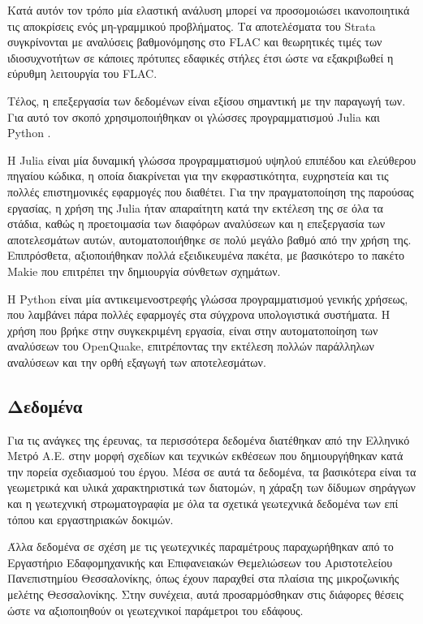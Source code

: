 Κατά αυτόν τον τρόπο μία ελαστική ανάλυση μπορεί να προσομοιώσει ικανοποιητικά τις αποκρίσεις ενός μη-γραμμικού προβλήματος. Τα αποτελέσματα του Strata συγκρίνονται με αναλύσεις βαθμονόμησης στο FLAC και θεωρητικές τιμές των ιδιοσυχνοτήτων σε κάποιες πρότυπες εδαφικές στήλες έτσι ώστε να εξακριβωθεί η εύρυθμη λειτουργία του FLAC.

Τέλος, η επεξεργασία των δεδομένων είναι εξίσου σημαντική με την παραγωγή των. Για αυτό τον σκοπό χρησιμοποιήθηκαν οι γλώσσες προγραμματισμού Julia \parencite{Julia-2017} και Python \parencite{van1995python}.

Η Julia είναι μία δυναμική γλώσσα προγραμματισμού υψηλού επιπέδου και ελεύθερου πηγαίου κώδικα, η οποία διακρίνεται για την εκφραστικότητα, ευχρηστεία και τις πολλές επιστημονικές εφαρμογές που διαθέτει. Για την πραγματοποίηση της παρούσας εργασίας, η χρήση της Julia ήταν απαραίτητη κατά την εκτέλεση της σε όλα τα στάδια, καθώς η προετοιμασία των διαφόρων αναλύσεων και η επεξεργασία των αποτελεσμάτων αυτών, αυτοματοποιήθηκε σε πολύ μεγάλο βαθμό από την χρήση της. Επιπρόσθετα, αξιοποιήθηκαν πολλά εξειδικευμένα πακέτα, με βασικότερο το πακέτο Makie \parencite{DanischKrumbiegel2021} που επιτρέπει την δημιουργία σύνθετων σχημάτων.

Η Python είναι μία αντικειμενοστρεφής γλώσσα προγραμματισμού γενικής χρήσεως, που λαμβάνει πάρα πολλές εφαρμογές στα σύγχρονα υπολογιστικά συστήματα. Η χρήση που βρήκε στην συγκεκριμένη εργασία, είναι στην αυτοματοποίηση των αναλύσεων του OpenQuake, επιτρέποντας την εκτέλεση πολλών παράλληλων αναλύσεων και την ορθή εξαγωγή των αποτελεσμάτων.


\subsection{Δεδομένα}
Για τις ανάγκες της έρευνας, τα περισσότερα δεδομένα διατέθηκαν από την Ελληνικό Μετρό Α.Ε. στην μορφή σχεδίων και τεχνικών εκθέσεων που δημιουργήθηκαν κατά την πορεία σχεδιασμού του έργου. Μέσα σε αυτά τα δεδομένα, τα βασικότερα είναι τα γεωμετρικά και υλικά χαρακτηριστικά των διατομών, η χάραξη των δίδυμων σηράγγων και η γεωτεχνική στρωματογραφία με όλα τα σχετικά γεωτεχνικά δεδομένα των επί τόπου και εργαστηριακών δοκιμών.

Άλλα δεδομένα σε σχέση με τις γεωτεχνικές παραμέτρους παραχωρήθηκαν από το Εργαστήριο Εδαφομηχανικής και Επιφανειακών Θεμελιώσεων του Αριστοτελείου Πανεπιστημίου Θεσσαλονίκης, όπως έχουν παραχθεί στα πλαίσια της μικροζωνικής μελέτης Θεσσαλονίκης. Στην συνέχεια, αυτά προσαρμόσθηκαν στις διάφορες θέσεις ώστε να αξιοποιηθούν οι γεωτεχνικοί παράμετροι του εδάφους.

